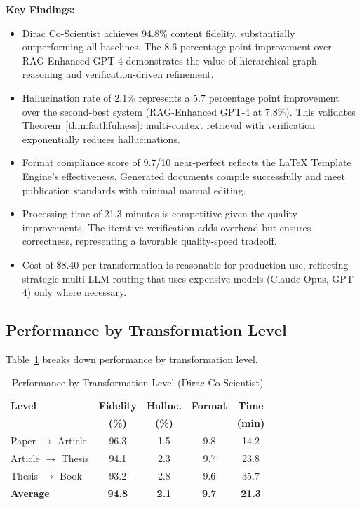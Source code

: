 \documentclass{ieeeaccess}
\begin{document}
\textbf{Key Findings:}

\begin{itemize}
\item Dirac Co-Scientist achieves 94.8\% content fidelity, substantially outperforming all baselines. The 8.6 percentage point improvement over RAG-Enhanced GPT-4 demonstrates the value of hierarchical graph reasoning and verification-driven refinement.

\item Hallucination rate of 2.1\% represents a 5.7 percentage point improvement over the second-best system (RAG-Enhanced GPT-4 at 7.8\%). This validates Theorem~\ref{thm:faithfulness}: multi-context retrieval with verification exponentially reduces hallucinations.

\item Format compliance score of 9.7/10 near-perfect reflects the LaTeX Template Engine's effectiveness. Generated documents compile successfully and meet publication standards with minimal manual editing.

\item Processing time of 21.3 minutes is competitive given the quality improvements. The iterative verification adds overhead but ensures correctness, representing a favorable quality-speed tradeoff.

\item Cost of \$8.40 per transformation is reasonable for production use, reflecting strategic multi-LLM routing that uses expensive models (Claude Opus, GPT-4) only where necessary.
\end{itemize}

\subsection{Performance by Transformation Level}

Table~\ref{tab:level-results} breaks down performance by transformation level.

\begin{table}[!t]
\caption{Performance by Transformation Level (Dirac Co-Scientist)}
\label{tab:level-results}
\centering
\renewcommand{\arraystretch}{1.2}
\footnotesize
\begin{tabular}{@{}lcccc@{}}
\toprule
\textbf{Level} & \textbf{Fidelity} & \textbf{Halluc.} & \textbf{Format} & \textbf{Time} \\
& \textbf{(\%)} & \textbf{(\%)} & & \textbf{(min)} \\
\midrule
Paper $\rightarrow$ Article & 96.3 & 1.5 & 9.8 & 14.2 \\
Article $\rightarrow$ Thesis & 94.1 & 2.3 & 9.7 & 23.8 \\
Thesis $\rightarrow$ Book & 93.2 & 2.8 & 9.6 & 35.7 \\
\midrule
\textbf{Average} & \textbf{94.8} & \textbf{2.1} & \textbf{9.7} & \textbf{21.3} \\
\bottomrule
\end{tabular}
\normalsize
\end{table}
\end{document}
